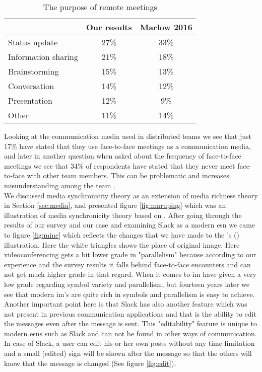 \begin{table}
\centering
\caption{The purpose of remote meetings} \label{table:remotepurpose}
\begin{tabular}{lcc}
\hline
& \textbf{Our results} & \textbf{Marlow 2016} \\ \hline
Status update&27\%&33\%\\
Information sharing&21\%&18\%\\
Brainstorming&	15\%&	13\%\\
Conversation&	14\%&	12\%\\
Presentation&	12\%&	9\%\\
Other&	11\%&	14\%\\
\hline
\end{tabular}
\end{table}

Looking at the communication media used in distributed teams we see that just 17\% have stated that they use face-to-face meetings as a communication media, and later in another question when asked about the frequency of face-to-face meetings we see that 34\% of respondents have stated that they never meet face-to-face with other team members. This can be problematic and increases misunderstanding among the team \citep{Curtis1988}.\\



We discussed media synchronicity theory as an extension of media richness theory in Section \ref{sec:media}, and presented figure \ref{fig:maruping} which was an illustration of media synchronicity theory based on \citet{Maruping2004}. After going through the results of our survey and our case and examining Slack as a modern \ac{esn} we came to figure \ref{fig:mine} which reflects the changes that we have made to the \citeauthor{Maruping2004}'s (\citeyear{Maruping2004}) illustration. Here the white triangles shows the place of original image. Here videoconferencing gets a bit lower grade in "parallelism" because according to our experience and the survey results it falls behind face-to-face encounters and can not get much higher grade in that regard. When it comes to \ac{im} \citet{Maruping2004} have given a very low grade regarding symbol variety and parallelism, but fourteen years later we see that modern \ac{im}'s are quite rich in symbols and parallelism is easy to achieve. Another important point here is that Slack has also another feature which was not present in previous communication applications and that is the ability to edit the messages even after the message is sent. This "editability" feature is unique to modern \ac{esn}s such as Slack and can not be found in other ways of communication. In case of Slack, a user can edit his or her own posts without any time limitation and a small (edited) sign will be shown after the message so that the others will know that the message is changed (See figure \ref{fig:edit}).

